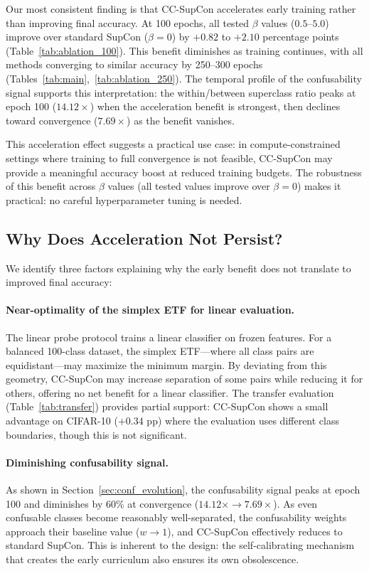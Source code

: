 \documentclass{article}
\begin{document}
Our most consistent finding is that CC-SupCon accelerates early training rather than improving final accuracy. At 100 epochs, all tested $\beta$ values ($0.5$--$5.0$) improve over standard SupCon ($\beta = 0$) by $+0.82$ to $+2.10$ percentage points (Table~\ref{tab:ablation_100}). This benefit diminishes as training continues, with all methods converging to similar accuracy by 250--300 epochs (Tables~\ref{tab:main},~\ref{tab:ablation_250}). The temporal profile of the confusability signal supports this interpretation: the within/between superclass ratio peaks at epoch 100 ($14.12\times$) when the acceleration benefit is strongest, then declines toward convergence ($7.69\times$) as the benefit vanishes.

This acceleration effect suggests a practical use case: in compute-constrained settings where training to full convergence is not feasible, CC-SupCon may provide a meaningful accuracy boost at reduced training budgets. The robustness of this benefit across $\beta$ values (all tested values improve over $\beta = 0$) makes it practical: no careful hyperparameter tuning is needed.

\subsection{Why Does Acceleration Not Persist?}

We identify three factors explaining why the early benefit does not translate to improved final accuracy:

\paragraph{Near-optimality of the simplex ETF for linear evaluation.} The linear probe protocol trains a linear classifier on frozen features. For a balanced 100-class dataset, the simplex ETF---where all class pairs are equidistant---may maximize the minimum margin. By deviating from this geometry, CC-SupCon may increase separation of some pairs while reducing it for others, offering no net benefit for a linear classifier. The transfer evaluation (Table~\ref{tab:transfer}) provides partial support: CC-SupCon shows a small advantage on CIFAR-10 ($+0.34$ pp) where the evaluation uses different class boundaries, though this is not significant.

\paragraph{Diminishing confusability signal.} As shown in Section~\ref{sec:conf_evolution}, the confusability signal peaks at epoch 100 and diminishes by 60\% at convergence ($14.12\times \to 7.69\times$). As even confusable classes become reasonably well-separated, the confusability weights approach their baseline value ($w \to 1$), and CC-SupCon effectively reduces to standard SupCon. This is inherent to the design: the self-calibrating mechanism that creates the early curriculum also ensures its own obsolescence.
\end{document}
